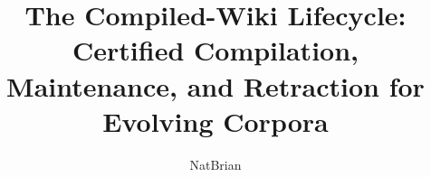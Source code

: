 \documentclass{article}
\title{The Compiled-Wiki Lifecycle: Certified Compilation,\\ Maintenance, and Retraction for Evolving Corpora}
\author{NatBrian}
\theoremstyle{plain}
\theoremstyle{definition}
\theoremstyle{remark}
\begin{document}
\maketitle

\begin{abstract}

\end{abstract}













\end{document}
